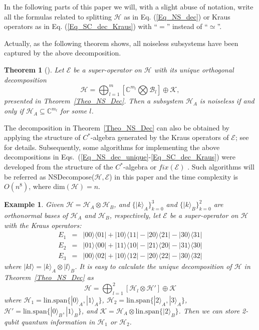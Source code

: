 \documentclass[journal]{IEEEtran}
\def\h{\ensuremath{\mathcal{H}}}
\def\k{\ensuremath{\mathcal{K}}}
\def\b{\ensuremath{\mathcal{B}}}
\def\e{\ensuremath{\mathcal{E}}}
\def\k{\mathcal{K}}
\newtheorem{theorem}{Theorem}
\newtheorem{example}{Example}
\begin{document}
In the following parts of this paper we will, with a slight abuse of notation,
write all the formulas related to splitting $\h$ as in Eq. (\ref{Eq_NS_dec})  or Kraus operators as in Eq. (\ref{Eq_SC_dec_Kraus}) with ``$=$'' instead of ``$\simeq$''.

Actually, as the following theorem shows, all noiseless subsystems have been captured by the above decomposition.
\begin{theorem}[\cite{blume2010information}]
  Let $\e$ be a super-operator on $\h$ with its unique orthogonal decomposition
   $$\h=\bigoplus_{l=1}^m\left[\mathbb{C}^{m_l}\bigotimes\b_l\right]\oplus\k,$$
   presented in Theorem~\ref{Theo_NS_Dec}. Then
    a subsystem $\h_A$ is noiseless if and only if $\h_A\subseteq \mathbb{C}^{m_l}$ for some $l$.
\end{theorem}

The decomposition in Theorem~\ref{Theo_NS_Dec} can also be obtained by applying the structure of  $C^*$-algebra generated by the Kraus operators of $\e$; see \cite{choi2006method} for details. Subsequently, some algorithms for implementing the above decompositions in Eqs.~(\ref{Eq_NS_dec_unique}-\ref{Eq_SC_dec_Kraus}) were developed from the structure of the $C^*$-algebra   or $fix(\e)$   \cite{guan2016decomposition,knill2006protected,wang2013numerical}.  Such algorithms will be referred as NSDecompose($\h,\e$) in this paper and the time complexity is $O(n^{8})$, where dim$(\h)=n$. 

\begin{example}
  Given $\h=\h_A\otimes \h_B$, and $\{|k\rangle_A\}_{k=0}^3$ and $\{|k\rangle_B\}_{k=0}^2$ are orthonormal bases of $\h_A$ and $\h_B$, respectively, let $\e$ be a super-operator on $\h$ with the Kraus operators:
  \begin{eqnarray*}
    E_{1}&=&|00\rangle\langle01|+|10\rangle\langle11|-|20\rangle\langle21|-|30\rangle\langle31|\\
    E_{2}&=&|01\rangle\langle00|+|11\rangle\langle10|-|21\rangle\langle20|-|31\rangle\langle30|\\
    E_{3}&=&|00\rangle\langle02|+|10\rangle\langle12|-|20\rangle\langle22|-|30\rangle\langle32|
  \end{eqnarray*}
  where $|kl\rangle=|k\rangle_A\otimes |l\rangle_B$. It is easy to calculate the unique decomposition of $\h$ in Theorem~\ref{Theo_NS_Dec} as 
  $$\h=\bigoplus_{l=1}^2\left[\h_l\otimes \h'\right] \oplus\k$$
  where $\h_1=\textrm{lin.span}\{|0\rangle_A,|1\rangle_A\}$, $\h_2=\textrm{lin.span}\{|2\rangle_A,|3\rangle_A\}$, $\h'=\textrm{lin.span}\{|0\rangle_B,|1\rangle_B\}$, and $\k = \h_A\otimes \textrm{lin.span}\{|2\rangle_B\}$. Then we can store 2-qubit quantum information in $\h_1$ or $\h_2$.
\end{example}
\end{document}
